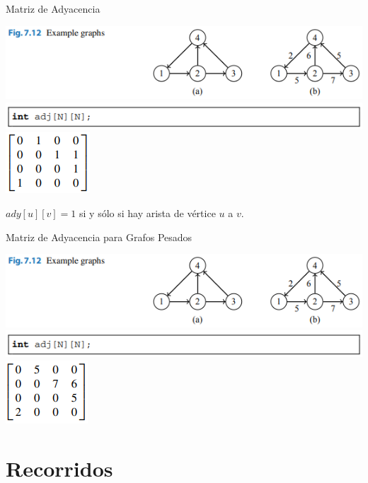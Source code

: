 \documentclass{beamer}
\begin{document}
\begin{frame}{Matriz de Adyacencia}
	\begin{center}
		\includegraphics[]{figuras/7.12-grafo-ejemplo.PNG}
		\includegraphics[]{figuras/matriz.PNG}
		\includegraphics[]{figuras/matriz-no-pesado.PNG}
	\end{center}
	$ady[u][v] = 1$ si y sólo si hay arista de vértice $u$ a $v$.
\end{frame}

\begin{frame}{Matriz de Adyacencia para Grafos Pesados}
	\begin{center}
		\includegraphics[]{figuras/7.12-grafo-ejemplo.PNG}
		\includegraphics[]{figuras/matriz.PNG}
		\includegraphics[]{figuras/matriz-pesado.PNG}
	\end{center}
\end{frame}

\section{Recorridos}
\end{document}
